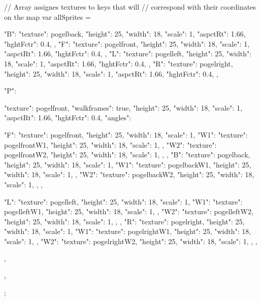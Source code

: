 // Array assignes textures to keys that will
// correspond with their coordinates on the map
var allSprites = {
  "B": {
    "texture": pogelback,
    "height": 25,
    "width": 18,
    "scale": 1,
    "aspctRt": 1.66,
    "hghtFctr": 0.4,
  },
  "F": {
    "texture": pogelfront,
    "height": 25,
    "width": 18,
    "scale": 1,
    "aspctRt": 1.66,
    "hghtFctr": 0.4,
  },
  "L": {
    "texture": pogelleft,
    "height": 25,
    "width": 18,
    "scale": 1,
    "aspctRt": 1.66,
    "hghtFctr": 0.4,
  },
  "R": {
    "texture": pogelright,
    "height": 25,
    "width": 18,
    "scale": 1,
    "aspctRt": 1.66,
    "hghtFctr": 0.4,
  },

  "P": {
    "texture": pogelfront,
    "walkframes": true,
    "height": 25,
    "width": 18,
    "scale": 1,
    "aspctRt": 1.66,
    "hghtFctr": 0.4,
    "angles":{
      "F": {
        "texture": pogelfront,
        "height": 25,
        "width": 18,
        "scale": 1,
        "W1": {
          "texture": pogelfrontW1,
          "height": 25,
          "width": 18,
          "scale": 1,
        },
        "W2": {
          "texture": pogelfrontW2,
          "height": 25,
          "width": 18,
          "scale": 1,
        },
      },
      "B": {
        "texture": pogelback,
        "height": 25,
        "width": 18,
        "scale": 1,
        "W1": {
          "texture": pogelbackW1,
          "height": 25,
          "width": 18,
          "scale": 1,
        },
        "W2": {
          "texture": pogelbackW2,
          "height": 25,
          "width": 18,
          "scale": 1,
        },
      },

      "L": {
        "texture": pogelleft,
        "height": 25,
        "width": 18,
        "scale": 1,
        "W1": {
          "texture": pogelleftW1,
          "height": 25,
          "width": 18,
          "scale": 1,
        },
        "W2": {
          "texture": pogelleftW2,
          "height": 25,
          "width": 18,
          "scale": 1,
        },
      },
      "R": {
        "texture": pogelright,
        "height": 25,
        "width": 18,
        "scale": 1,
        "W1": {
          "texture": pogelrightW1,
          "height": 25,
          "width": 18,
          "scale": 1,
        },
        "W2": {
          "texture": pogelrightW2,
          "height": 25,
          "width": 18,
          "scale": 1,
        },
      },
    },
  },
};


